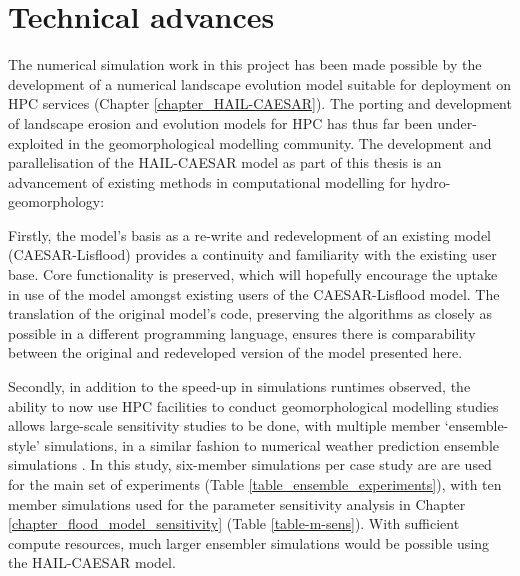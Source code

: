 \section{Technical advances}
The numerical simulation work in this project has been made possible by the development of a numerical landscape evolution model suitable for deployment on HPC services (Chapter \ref{chapter_HAIL-CAESAR}). The porting and development of landscape erosion and evolution models for HPC has thus far been under-exploited in the geomorphological modelling community. The development and parallelisation of the HAIL-CAESAR model as part of this thesis is an advancement of existing methods in computational modelling for hydro-geomorphology:

Firstly, the model's basis as a re-write and redevelopment of an existing model (CAESAR-Lisflood) provides a continuity and familiarity with the existing user base. Core functionality is preserved, which will hopefully encourage the uptake in use of the model amongst existing users of the CAESAR-Lisflood model. The translation of the original model's code, preserving the algorithms as closely as possible in a different programming language, ensures there is comparability between the original and redeveloped version of the model presented here. 

Secondly, in addition to the speed-up in simulations runtimes observed, the ability to now use HPC facilities to conduct geomorphological modelling studies allows large-scale sensitivity studies to be done, with multiple member `ensemble-style' simulations, in a similar fashion to numerical weather prediction ensemble simulations \citep{sivillo1997ensemble,klein2015variability}. In this study, six-member simulations per case study are are used for the main set of experiments (Table \ref{table_ensemble_experiments}), with ten member simulations used for the parameter sensitivity analysis in Chapter \ref{chapter_flood_model_sensitivity} (Table \ref{table-m-sens}). With sufficient compute resources, much larger ensembler simulations would be possible using the HAIL-CAESAR model.

